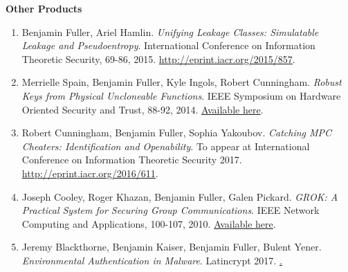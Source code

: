 \documentclass{article}
\begin{document}
\noindent
\textbf{Other Products}
\begin{enumerate}

\item Benjamin Fuller, Ariel Hamlin.  \emph{Unifying Leakage Classes: Simulatable Leakage and Pseudoentropy}.  International Conference on Information Theoretic Security, 69-86, 2015. \href{http://eprint.iacr.org/2015/857}{http://eprint.iacr.org/2015/857}.

\item Merrielle Spain, Benjamin Fuller, Kyle Ingols, Robert Cunningham.  \emph{Robust Keys from Physical Uncloneable Functions}.  IEEE Symposium on Hardware Oriented Security and Trust, 88-92, 2014. \href{http://ieeexplore.ieee.org/xpls/abs_all.jsp?arnumber=6855575}{Available here}.

\item Robert Cunningham, Benjamin Fuller, Sophia Yakoubov.  \emph{Catching MPC Cheaters: Identification and Openability}.  To appear at International Conference on Information Theoretic Security  2017.  \href{http://eprint.iacr.org/2016/611}{http://eprint.iacr.org/2016/611}.

\item Joseph Cooley, Roger Khazan, Benjamin Fuller, Galen Pickard.  \emph{GROK: A Practical System for Securing Group Communications}.  IEEE Network Computing and Applications, 100-107, 2010. \href{http://ieeexplore.ieee.org/xpls/abs_all.jsp?arnumber=5598226}{Available here}.

\item Jeremy Blackthorne, Benjamin Kaiser, Benjamin Fuller, Bulent Yener.  \emph{Environmental Authentication in Malware}.  Latincrypt 2017.  \href{https://eprint.iacr.org/2017/928}.
\end{enumerate}
\end{document}
